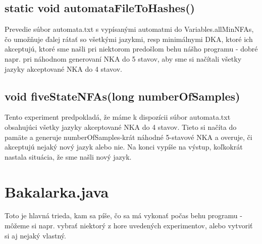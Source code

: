 \subsection*{static void automataFileToHashes()}
Prevedie súbor automata.txt s vypísanými automatmi do Variables.allMinNFAs, čo umožňuje ďalej rátať so všetkými jazykmi, resp minimálnymi DKA, ktoré ich akceptujú, ktoré sme našli pri niektorom predošlom behu nášho programu - dobré napr. pri náhodnom generovaní NKA do 5 stavov, aby sme si načítali všetky jazyky akceptované NKA do 4 stavov.

\subsection*{void fiveStateNFAs(long numberOfSamples)}
Tento experiment predpokladá, že máme k dispozícii súbor automata.txt obsahujúci všetky jazyky akceptované NKA do 4 stavov. Tieto si načíta do pamäte a generuje numberOfSamples-krát náhodné 5-stavové NKA a overuje, či akceptujú nejaký nový jazyk alebo nie. Na konci vypíše na výstup, koľkokrát nastala situácia, že sme našli nový jazyk.

\section{Bakalarka.java}
Toto je hlavná trieda, kam sa píše, čo sa má vykonať počas behu programu - môžeme si napr. vybrať niektorý z hore uvedených experimentov, alebo vytvoriť si aj nejaký vlastný.
